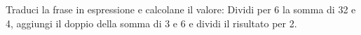 \item Traduci la frase in espressione e calcolane il valore: Dividi per 6 la somma di 32 e 4, aggiungi il doppio della somma di 3 e 6 e dividi il risultato per 2.